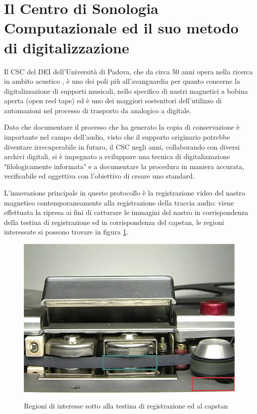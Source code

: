 \section{Il Centro di Sonologia Computazionale ed il suo metodo di digitalizzazione} \label{sec:csc-digitalizzazione}
Il \acf{CSC} del \acf{DEI} dell'Università di Padova, che da circa 50 anni opera nella ricerca in ambito acustico \cite{canazzaGestureMusicComputer2022}, è uno dei poli più all'avanguardia per quanto concerne la digitalizzazione di supporti musicali, nello specifico di nastri magnetici a bobina aperta (open reel tape) ed è uno dei maggiori sostenitori dell'utilizzo di automazioni nel processo di trasporto da analogico a digitale.

Dato che documentare il processo che ha generato la copia di conservazione è importante nel campo dell'audio, visto che il supporto originario potrebbe diventare irrecuperabile in futuro, il \ac{CSC} negli anni, collaborando con diversi archivi digitali, si è impegnato a sviluppare una tecnica di digitalizzazione "filologicamente informata" e a documentare la procedura in maniera accurata, verificabile ed oggettiva con l'obiettivo di creare uno standard.

L'innovazione principale in questo protocollo è la registrazione video del nastro magnetico contemporaneamente alla registrazione della traccia audio: viene effettuata la ripresa ai fini di catturare le immagini del nastro in corrispondenza della testina di registrazione ed in corrispondenza del capstan, le regioni interessate si possono trovare in figura \ref{fig:tape-areas}.

\begin{figure}[hb]
    \centering
    \includegraphics[width=\textwidth]{img/tape_areas.png}
    \caption{Regioni di interesse sotto alla testina di registrazione ed al capstan \cite{russoEnhancingPreservationRestoration2023}}
    \label{fig:tape-areas}
\end{figure}

